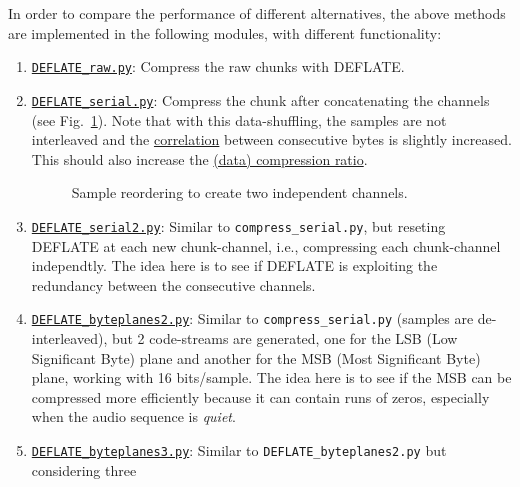 In order to compare the performance of different alternatives, the
above methods are implemented in the following modules, with different
functionality:

\begin{enumerate}
\item
  \href{https://github.com/Tecnologias-multimedia/InterCom/blob/master/src/DEFLATE\_raw.py}{\texttt{DEFLATE\_raw.py}}:
  Compress the raw chunks with DEFLATE.
\item
  \href{https://github.com/Tecnologias-multimedia/InterCom/blob/master/src/DEFLATE\_serial.py}{\texttt{DEFLATE\_serial.py}}:
  Compress the chunk after concatenating the channels (see
  Fig.~\ref{fig:reordering}). Note that with this data-shuffling,
  the samples are not interleaved and the
  \href{https://en.wikipedia.org/wiki/Correlation}{correlation}
  between consecutive bytes is slightly increased. This should also
  increase the
  \href{https://en.wikipedia.org/wiki/Data_compression_ratio}{(data)
    compression ratio}.
\begin{figure}
  \begin{center}
  \end{center}
  \caption{Sample reordering to create two independent channels.}
  \label{fig:reordering}
\end{figure}
\item
  \href{https://github.com/Tecnologias-multimedia/InterCom/blob/master/src/DEFLATE\_serial2.py}{\texttt{DEFLATE\_serial2.py}}:
  Similar to \verb|compress_serial.py|, but reseting DEFLATE at each
  new chunk-channel, i.e., compressing each chunk-channel
  independtly. The idea here is to see if DEFLATE is exploiting the
  redundancy between the consecutive channels.
\item
  \href{https://github.com/Tecnologias-multimedia/InterCom/blob/master/src/DEFLATE\_byteplanes2.py}{\texttt{DEFLATE\_byteplanes2.py}}:
  Similar to \verb|compress_serial.py| (samples are de-interleaved),
  but 2 code-streams are generated, one for the LSB (Low Significant
  Byte) plane and another for the MSB (Most Significant Byte) plane,
  working with 16 bits/sample. The idea here is to see if the MSB can
  be compressed more efficiently because it can contain runs of zeros,
  especially when the audio sequence is \emph{quiet}.
\item
  \href{https://github.com/Tecnologias-multimedia/InterCom/blob/master/src/DEFLATE\_byteplanes3.py}{\texttt{DEFLATE\_byteplanes3.py}}:
  Similar to \verb|DEFLATE_byteplanes2.py| but considering three

\end{enumerate}
